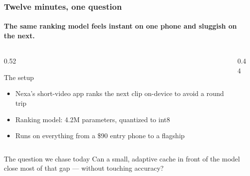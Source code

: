 \begin{frame}
  \frametitle{Twelve minutes, one question}
  \framesubtitle{The same ranking model feels instant on one phone and sluggish on the next.}
  \small
  \begin{columns}[T]
    \begin{column}{0.52\textwidth}
      \begin{block}{The setup}
        \begin{itemize}
          \item Nexa's short-video app ranks the next clip on-device to avoid a round trip
          \item Ranking model: 4.2M parameters, quantized to int8
          \item Runs on everything from a \$90 entry phone to a flagship
        \end{itemize}
      \end{block}
    \end{column}
    \begin{column}{0.44\textwidth}
      \begin{tcolorbox}[colback=mist,colframe=signalteal,boxrule=0.6pt,arc=2mm,title={\color{white}Field data, 3 weeks},colbacktitle=signalteal]
        \\[4pt]
        \\[4pt]
      \end{tcolorbox}
    \end{column}
  \end{columns}
  \vspace{3mm}
  \begin{alertblock}{The question we chase today}
    Can a small, adaptive cache in front of the model close most of that gap --- without touching accuracy?
  \end{alertblock}
\end{frame}
